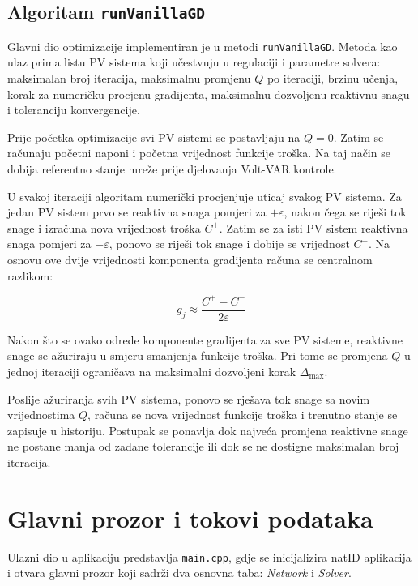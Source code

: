 \documentclass[12pt,oneside, a4paper]{book}
\begin{document}
\subsection{Algoritam \texttt{runVanillaGD}}

Glavni dio optimizacije implementiran je u metodi \texttt{runVanillaGD}. Metoda kao ulaz prima listu PV sistema koji učestvuju u regulaciji i parametre solvera: maksimalan broj iteracija, maksimalnu promjenu $Q$ po iteraciji, brzinu učenja, korak za numeričku procjenu gradijenta, maksimalnu dozvoljenu reaktivnu snagu i toleranciju konvergencije.

Prije početka optimizacije svi PV sistemi se postavljaju na $Q=0$. Zatim se računaju početni naponi i početna vrijednost funkcije troška. Na taj način se dobija referentno stanje mreže prije djelovanja Volt-VAR kontrole.

U svakoj iteraciji algoritam numerički procjenjuje uticaj svakog PV sistema. Za jedan PV sistem prvo se reaktivna snaga pomjeri za $+\varepsilon$, nakon čega se riješi tok snage i izračuna nova vrijednost troška $C^+$. Zatim se za isti PV sistem reaktivna snaga pomjeri za $-\varepsilon$, ponovo se riješi tok snage i dobije se vrijednost $C^-$. Na osnovu ove dvije vrijednosti komponenta gradijenta računa se centralnom razlikom:

\begin{equation}
   g_j \approx \frac{C^+ - C^-}{2\varepsilon}
\end{equation}

Nakon što se ovako odrede komponente gradijenta za sve PV sisteme, reaktivne snage se ažuriraju u smjeru smanjenja funkcije troška. Pri tome se promjena $Q$ u jednoj iteraciji ograničava na maksimalni dozvoljeni korak $\Delta_{\max}$.

Poslije ažuriranja svih PV sistema, ponovo se rješava tok snage sa novim vrijednostima $Q$, računa se nova vrijednost funkcije troška i trenutno stanje se zapisuje u historiju. Postupak se ponavlja dok najveća promjena reaktivne snage ne postane manja od zadane tolerancije ili dok se ne dostigne maksimalan broj iteracija.

\section{Glavni prozor i tokovi podataka}

 Ulazni dio u aplikaciju predstavlja \texttt{main.cpp}, gdje se inicijalizira natID aplikacija i otvara glavni prozor koji sadrži dva osnovna taba: \textit{Network} i \textit{Solver}.
\end{document}
